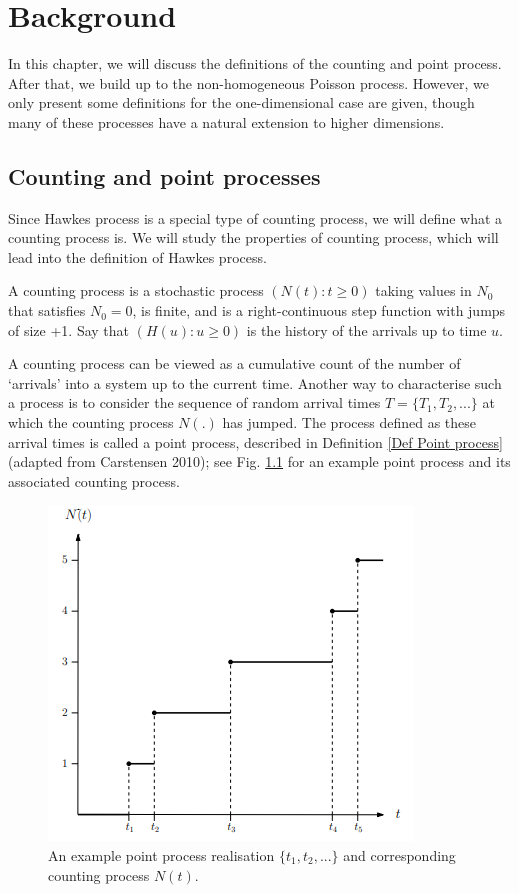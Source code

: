 \chapter{Background}
In this chapter, we will discuss the definitions
of the counting and point process. After that, we build up to the non-homogeneous Poisson process. However, we only present some definitions for the one-dimensional case are given, though many of these processes have a natural extension to higher dimensions.
\section{Counting and point processes}
Since Hawkes process is a special type of counting process, we will define what a counting process is. We will study the properties of counting process, which will lead into the definition of Hawkes process.

\begin{Definition}
	A counting process is a stochastic process $(N(t):t \geq 0)$ taking values in
	$N_{0}$ that satisfies $N_{0} = 0$, is finite, and is a right-continuous step function
	with jumps of size +1. Say that $(H(u) : u \geq 0)$ is the history of the arrivals
	up to time $u$.
\end{Definition}

A counting process can be viewed as a cumulative count of the number of ‘arrivals’ into a system up to the current time. Another way to characterise such a
process is to consider the sequence of random arrival times $T = \{T_{1}, T_{2}, . . .\}$ at which
the counting process $N(.)$ has jumped. The process defined as these arrival times is
called a point process, described in Definition \ref{Def Point process} (adapted from Carstensen 2010); see Fig. \ref{PointAndCountingProcess} for an example point process and its associated counting process.

  \begin{figure}[H]
  	\centering
  	\includegraphics{PointProcessAndCountingProcess.PNG}
  	\caption{An example point process realisation $\{t_{1}, t_{2}, . . . \}$ and corresponding counting process $N(t)$.}
  	\label{PointAndCountingProcess}
  \end{figure}

